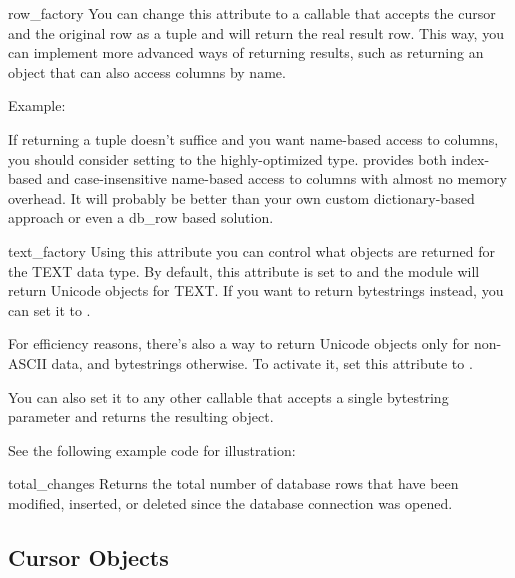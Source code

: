 \begin{memberdesc}{row_factory}
  You can change this attribute to a callable that accepts the cursor and
  the original row as a tuple and will return the real result row.  This
  way, you can implement more advanced ways of returning results, such 
  as returning an object that can also access columns by name.

  Example:

  

  If returning a tuple doesn't suffice and you want name-based
  access to columns, you should consider setting  to the
  highly-optimized  type.  provides both
  index-based and case-insensitive name-based access to columns with almost
  no memory overhead. It will probably be better than your own custom 
  dictionary-based approach or even a db_row based solution.
\end{memberdesc}

\begin{memberdesc}{text_factory}
  Using this attribute you can control what objects are returned for the
  TEXT data type. By default, this attribute is set to  and
  the  module will return Unicode objects for TEXT. If you want to return
  bytestrings instead, you can set it to .

  For efficiency reasons, there's also a way to return Unicode objects only
  for non-ASCII data, and bytestrings otherwise. To activate it, set this
  attribute to .

  You can also set it to any other callable that accepts a single bytestring
  parameter and returns the resulting object.

  See the following example code for illustration:

  
\end{memberdesc}

\begin{memberdesc}{total_changes}
  Returns the total number of database rows that have been modified, inserted,
  or deleted since the database connection was opened.
\end{memberdesc}





\subsection{Cursor Objects \label{sqlite3-Cursor-Objects}}

